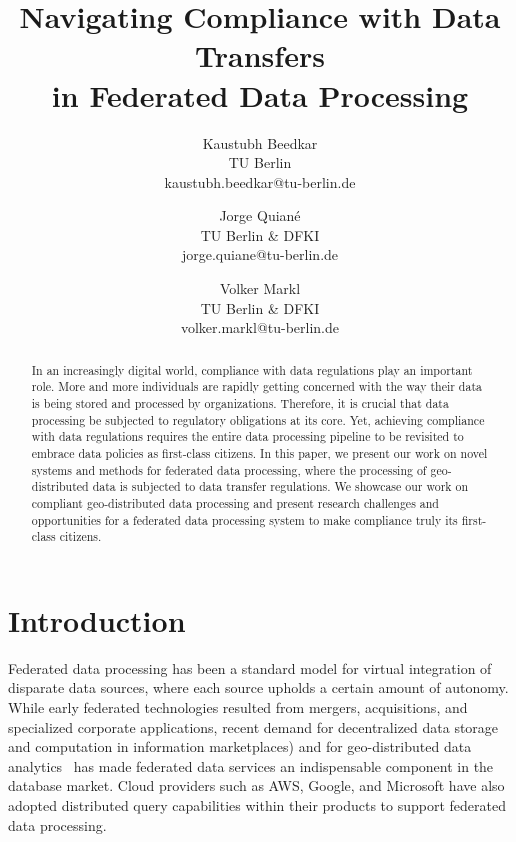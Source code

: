 \documentclass[11pt]{article}
\begin{document}
\title{Navigating Compliance with Data Transfers \\in Federated Data Processing}

\author{Kaustubh Beedkar \\TU Berlin\\kaustubh.beedkar@tu-berlin.de
\and
Jorge Quian\'e\\TU Berlin \& DFKI\\jorge.quiane@tu-berlin.de
\and Volker Markl \\TU Berlin \& DFKI \\ volker.markl@tu-berlin.de
}


\maketitle

\begin{abstract}
In an increasingly digital world, compliance with data
regulations play an important role. More and more
individuals are rapidly getting concerned with the way
their data is being stored and processed by organizations.
Therefore, it is crucial that data processing be subjected
to regulatory obligations at its core. Yet, achieving
compliance with data regulations requires the entire data
processing pipeline to be revisited to embrace data
policies as first-class citizens. In this paper, we present
our work on novel systems and methods for federated data
processing, where the processing of geo-distributed data is
subjected to data transfer regulations. We showcase our
work on compliant geo-distributed data processing and
present research challenges and opportunities for a
federated data processing system to make compliance truly
its first-class citizens.
\end{abstract}


\section{Introduction}

Federated data processing has been a standard model for
virtual integration of disparate data sources, where each
source upholds a certain amount of autonomy. While early
federated technologies resulted from mergers, acquisitions,
and specialized corporate applications, recent demand for
decentralized data storage and computation in information
marketplaces\cite{agora}) and for geo-distributed data
analytics~\cite{Vulimiri:2015,Pu:2015,Hung2015} has made
federated data services an indispensable component in the
database market. Cloud providers such as AWS, Google, and
Microsoft have also adopted distributed query capabilities
within their products to support federated data processing.
\end{document}
